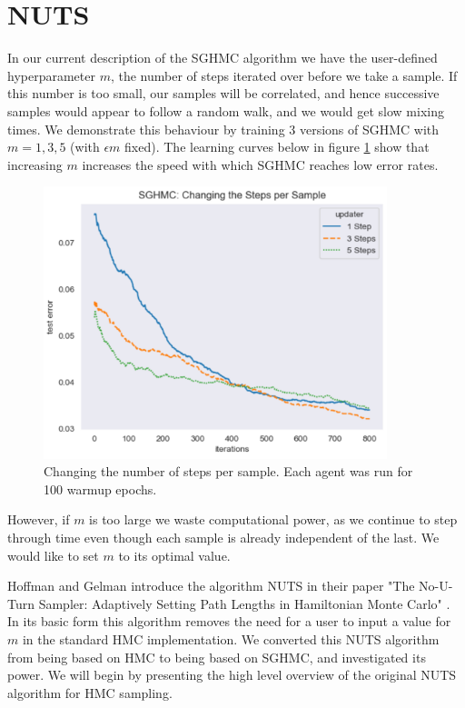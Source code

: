 \section{NUTS}

In our current description of the SGHMC algorithm we have the user-defined hyperparameter $m$, the number of steps iterated over before we take a sample. If this number is too small, our samples will be correlated, and hence successive samples would appear to follow a random walk, and we would get slow mixing times. We demonstrate this behaviour by training 3 versions of SGHMC with $m=1,3,5$ (with $\epsilon m$ fixed). The learning curves below in figure \ref{num_steps} show that increasing $m$ increases the speed with which SGHMC reaches low error rates.

\begin{figure}[h!]
\centering
\includegraphics[width=100mm]{parts/Images/changing_num_steps.png}
\caption{Changing the number of steps per sample. Each agent was run for 100 warmup epochs.}
\label{num_steps}
\end{figure}

However, if $m$ is too large we waste computational power, as we continue to step through time even though each sample is already independent of the last. We would like to set $m$ to its optimal value.

Hoffman and Gelman introduce the algorithm NUTS in their paper "The No-U-Turn Sampler: Adaptively Setting Path Lengths in Hamiltonian Monte Carlo" \cite{nuts}. In its basic form this algorithm removes the need for a user to input a value for $m$ in the standard HMC implementation. We converted this NUTS algorithm from being based on HMC to being based on SGHMC, and investigated its power. We will begin by presenting the high level overview of the original NUTS algorithm for HMC sampling.

